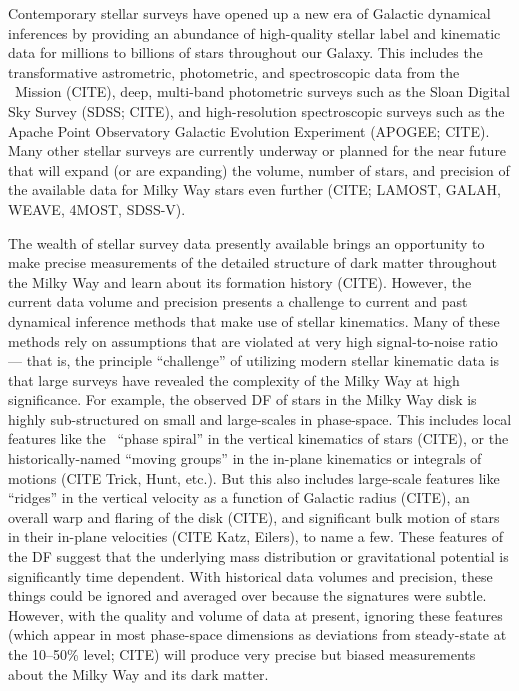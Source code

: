 Contemporary stellar surveys have opened up a new era of Galactic dynamical inferences
by providing an abundance of high-quality stellar label and kinematic data for millions
to billions of stars throughout our Galaxy.
This includes the transformative astrometric, photometric, and spectroscopic data from
the \gaia\ Mission (CITE), deep, multi-band photometric surveys such as the Sloan
Digital Sky Survey (SDSS; CITE), and high-resolution spectroscopic surveys such as the
Apache Point Observatory Galactic Evolution Experiment (APOGEE; CITE).
Many other stellar surveys are currently underway or planned for the near future that
will expand (or are expanding) the volume, number of stars, and precision of the
available data for Milky Way stars even further (CITE; LAMOST, GALAH, WEAVE, 4MOST,
SDSS-V).

The wealth of stellar survey data presently available brings an opportunity to make
precise measurements of the detailed structure of dark matter throughout the Milky Way
and learn about its formation history (CITE).
However, the current data volume and precision presents a challenge to current and past
dynamical inference methods that make use of stellar kinematics.
Many of these methods rely on assumptions that are violated at very high signal-to-noise
ratio --- that is, the principle ``challenge'' of utilizing modern stellar kinematic
data is that large surveys have revealed the complexity of the Milky Way at high
significance.
For example, the observed DF of stars in the Milky Way disk is highly sub-structured on
small and large-scales in phase-space.
This includes local features like the \gaia\ ``phase spiral'' in the vertical kinematics
of stars (CITE), or the historically-named ``moving groups'' in the in-plane kinematics
or integrals of motions (CITE Trick, Hunt, etc.).
But this also includes large-scale features like ``ridges'' in the vertical velocity as
a function of Galactic radius (CITE), an overall warp and flaring of the disk (CITE),
and significant bulk motion of stars in their in-plane velocities (CITE Katz, Eilers),
to name a few.
These features of the DF suggest that the underlying mass distribution or gravitational
potential is significantly time dependent.
With historical data volumes and precision, these things could be ignored and averaged
over because the signatures were subtle.
However, with the quality and volume of data at present, ignoring these features (which
appear in most phase-space dimensions as deviations from steady-state at the 10--50\%
level; CITE) will produce very precise but biased measurements about the Milky Way and
its dark matter.

